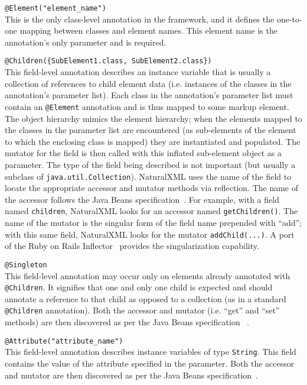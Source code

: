 \vspace*{0.5em}
\noindent\lstinline{@Element("element_name")}\\
This is the only class-level annotation in the framework, and it
defines the one-to-one mapping between classes and element names.  This
element name is the annotation's only parameter and is required.

\vspace*{0.5em}
\noindent\lstinline!@Children({SubElement1.class, SubElement2.class})!\\ 
This field-level annotation describes an instance variable that is
usually a collection of references to child element data
(i.e. instances of the classes in the annotation's parameter list).
Each class in the annotation's parameter list must contain an
\lstinline'@Element' annotation and is thus  mapped to some markup
element.  
The object hierarchy mimics the element hierarchy; when the elements
mapped to the classes in the parameter list are encountered (as 
sub-elements of the element to which the enclosing class is mapped) 
they are instantiated and populated.  The mutator for the field
is then called with this inflated sub-element object as a parameter.
The type of the field being
described is not important (but usually a subclass of
\lstinline{java.util.Collection}). 
NaturalXML uses the name of the
field to locate the appropriate accessor and mutator methods via
reflection.  The name of the accessor follows the Java Beans
specification~\cite{javaBeans}.  For example, with a field named
\lstinline'children', NaturalXML looks for an accessor named
\lstinline'getChildren()'.  The name of the mutator is the singular
form of the field name prepended with ``add''; with this same field,
NaturalXML looks for the mutator \lstinline'addChild(...)'.  A port of
the Ruby on Rails Inflector~\cite{inflector} provides the
singularization capability.

\vspace*{0.5em}
\noindent\lstinline!@Singleton!\\
This field-level annotation may occur only on elements already
annotated with \lstinline!@Children!.  It signifies that one and only
one child is expected and should annotate a reference to that child as
opposed to a collection (as in a standard \lstinline!@Children!
annotation).  Both the accessor and mutator (i.e. ``get'' and ``set'' methods)
are then discovered as per the Java Beans specification
~\cite{javaBeans}.

\vspace*{0.5em}
\noindent\lstinline!@Attribute("attribute_name")!\\
This field-level annotation describes instance variables of type
\lstinline'String'.  This field contains the value of the attribute specified in the parameter. Both the accessor and
mutator are then discovered as per the Java Beans
specification~\cite{javaBeans}.


